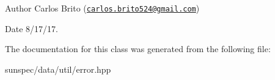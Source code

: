 \begin{DoxyAuthor}{Author}
Carlos Brito (\href{mailto:carlos.brito524@gmail.com}{\tt carlos.\+brito524@gmail.\+com}) 
\end{DoxyAuthor}
\begin{DoxyDate}{Date}
8/17/17. 
\end{DoxyDate}


The documentation for this class was generated from the following file\+:\begin{DoxyCompactItemize}
\item 
sunspec/data/util/error.\+hpp\end{DoxyCompactItemize}
